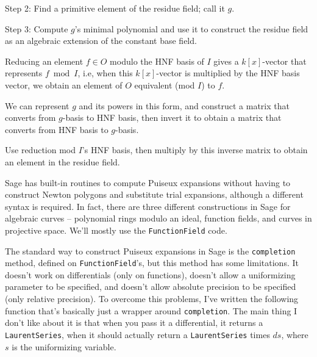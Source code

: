 Step 2: Find a primitive element of the residue field; call it $g$.

Step 3: Compute $g$'s minimal polynomial and use it to construct the residue field as an algebraic extension of the constant base field.

Reducing an element $f \in O$ modulo the HNF basis of $I$ gives a $k[x]$-vector that represents $f \bmod I$, i.e, when this $k[x]$-vector is multiplied by the HNF basis vector, we obtain an element of $O$ equivalent (mod $I$) to $f$.

We can represent $g$ and its powers in this form, and construct a matrix that converts from $g$-basis to HNF basis, then invert it to obtain a matrix that converts from HNF basis to $g$-basis.

Use reduction mod $I$'s HNF basis, then multiply by this inverse matrix to obtain an element in the residue field.



\vfill\eject
{}

Sage has built-in routines to compute Puiseux expansions without having to
construct Newton polygons and substitute trial expansions, although a
different syntax is required.  In fact, there are three different
constructions in Sage for algebraic curves -- polynomial rings
modulo an ideal, function fields, and curves in projective space.
We'll mostly use the {\tt FunctionField} code.

The standard way to construct Puiseux expansions in Sage is the {\tt completion} method,
defined on {\tt FunctionField}'s,
but this method has some limitations.  It doesn't work on
differentials (only on functions), doesn't allow a uniformizing parameter to be
specified, and doesn't allow absolute precision to be specified (only relative precision).
To overcome this problems, I've written the following function that's basically just
a wrapper around {\tt completion}.  The main thing I don't like about it is that
when you pass it a differential, it returns a {\tt LaurentSeries}, when it should actually
return a {\tt LaurentSeries} times $ds$, where $s$ is the uniformizing variable.

